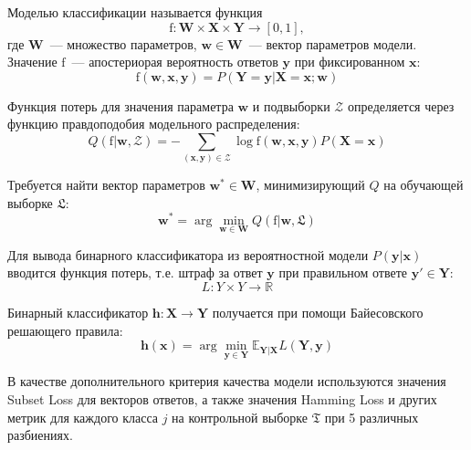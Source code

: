 \documentclass{ITaSconf}
\newcommand{\x}{\mathbf{x}}
\newcommand{\h}{\mathbf{h}}
\newcommand{\w}{\mathbf{w}}
\newcommand{\W}{\mathbf{W}}
\newcommand{\y}{\mathbf{y}}
\newcommand{\X}{\mathbf{X}}
\newcommand{\Y}{\mathbf{Y}}
\newcommand{\fx}{\mathbf{f}}
\newcommand{\fs}{\mbox{f}}
\newcommand\argmin{\arg\min}
\begin{document}

Моделью классификации называется функция
$$\fs\colon \W\times\X\times\Y\to [0,1],$$
где $\W$~--- множество параметров, $\w\in\W$~--- вектор параметров модели. Значение $\fs$~--- апостериорая вероятность ответов $\y$ при фиксированном $\x$:
$$\fs(\w,\x,\y)=P(\Y=\y|\X=\x;\w)$$


Функция потерь для значения параметра $\w$ и подвыборки $\mathcal{Z}$ определяется через функцию правдоподобия модельного распределения:
$$Q(\fs|\w, \mathcal{Z})=-\sum_{(\x,\y)\in\mathcal{Z}}\log \fs(\w,\x,\y)P(\X=\x)$$

%

Требуется найти вектор параметров $\w^*\in\W$, минимизирующий $Q$ на обучающей выборке $\mathfrak{L}$:
	$$\w^*=\argmin_{\w\in\W}Q(\fs|\w,\mathfrak{L})$$

Для вывода бинарного классификатора из вероятностной модели $P(\y|\x)$ вводится функция потерь, т.е. штраф за ответ $\y$ при правильном ответе $\y'\in\Y$:
$$L\colon Y\times Y\to \mathbb{R}$$

Бинарный классификатор $\h\colon\X\to\Y$ получается \cite{weiwei2010} при помощи Байесовского решающего правила:
$$\h(\x)=\argmin\limits_{\y\in\Y}\mathbb{E}_{\Y|\X}L(\Y,\y)$$

В качестве дополнительного критерия качества модели используются значения Subset Loss для векторов ответов, а также значения Hamming Loss и других метрик для каждого класса $j$ на контрольной выборке $\mathfrak{T}$ при 5 различных разбиениях.

\end{document}
